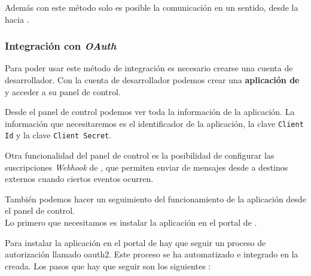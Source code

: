 Además con este método solo es posible la comunicación en un sentido, desde la \iface{} hacia \hs{}.

\subsubsection{Integración con \textit{OAuth}}
\label{subsec:app_hs}

Para poder usar este método de integración es necesario crearse una cuenta de desarrollador. Con la cuenta de desarrollador podemos crear una \textbf{aplicación de \hs{}} y acceder a su panel de control. 

Desde el panel de control podemos ver toda la información de la aplicación. La información que necesitaremos es el identificador de la aplicación, la clave \texttt{Client Id} y la clave \texttt{Client Secret}.

Otra funcionalidad del panel de control es la posibilidad de configurar las suscripciones \textit{Webhook} de \hs{}, que permiten enviar de mensajes desde \hs{} a destinos externos cuando ciertos eventos ocurren.

También podemos hacer un seguimiento del funcionamiento de la aplicación desde el panel de control. \\

Lo primero que necesitamos es instalar la aplicación en el portal de \hs{}.

Para instalar la aplicación en el portal de \hs{} hay que seguir un proceso de autorización llamado \gls{oauth2}. Este proceso se ha automatizado e integrado en la \iface{} creada. 
Los pasos que hay que seguir son los siguientes \cite{hsapi}:

